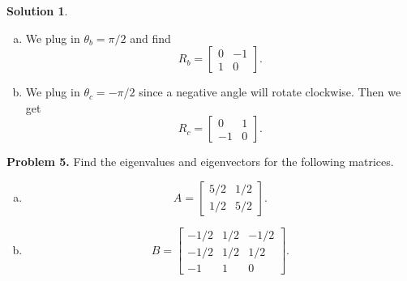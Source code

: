 \documentclass[12pt]{report} %
\theoremstyle{definition}
\newtheorem{solution}{Solution}
\begin{document}
\begin{solution}
\begin{enumerate}[(a)]
    \item We plug in $\theta_b = \pi/2$ and find
    \[
    R_b = \begin{bmatrix} 0 & -1 \\ 1 & 0\end{bmatrix}.
    \]
    
    \item We plug in $\theta_c = -\pi/2$ since a negative angle will rotate clockwise.  Then we get
    \[
    R_c = \begin{bmatrix} 0 & 1 \\ -1 & 0 \end{bmatrix}.
    \]
\end{enumerate}

\end{solution}

\noindent\textbf{Problem 5.} Find the eigenvalues and eigenvectors for the following matrices.
\begin{enumerate}[(a)]
    \item \[
    A= \begin{bmatrix} 5/2 & 1/2 \\ 1/2 & 5/2 \end{bmatrix}.
    \]
    \item \[
    B= \begin{bmatrix} -1/2 & 1/2 & -1/2 \\ -1/2 & 1/2 & 1/2 \\ -1 & 1 & 0\end{bmatrix}.
    \]
\end{enumerate}
\end{document}
